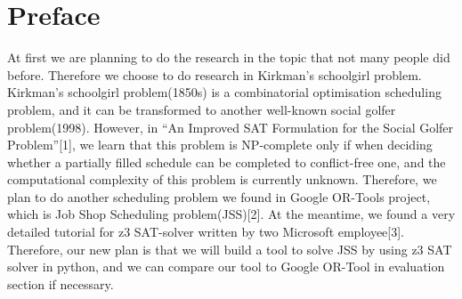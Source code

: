 \section*{Preface}
At first we are planning to do the research in the topic that not many people did before. Therefore we choose to do research in Kirkman's schoolgirl problem. Kirkman's schoolgirl problem(1850s) is a combinatorial optimisation scheduling problem, and it can be transformed to another well-known social golfer problem(1998). However, in “An Improved SAT Formulation for the Social Golfer Problem”[1], we learn that this problem is NP-complete only if when deciding whether a partially filled schedule can be completed to conflict-free one, and the computational complexity of this problem is currently unknown. Therefore, we plan to do another scheduling problem we found in Google OR-Tools project, which is Job Shop Scheduling problem(JSS)[2]. At the meantime, we found a very detailed tutorial for z3 SAT-solver written by two Microsoft employee[3]. Therefore, our new plan is that we will build a tool to solve JSS by using z3 SAT solver in python, and we can compare our tool to Google OR-Tool in evaluation section if necessary. 
